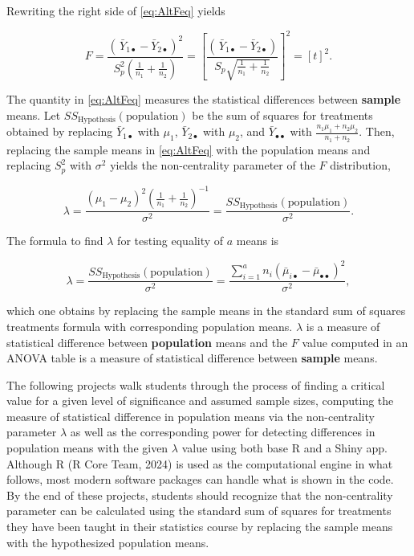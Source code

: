\documentclass[
]{article}
\begin{document}
Rewriting the right side of \eqref{eq:AltFeq} yields

\begin{equation}
F = \dfrac{(\,\bar{Y}_{1\bullet} -\bar{Y}_{2\bullet})^2 }{S^2_p\left( \frac{1}{n_1} + \frac{1}{n_2} \right)} = \left[ \dfrac{(\,\bar{Y}_{1\bullet} -\bar{Y}_{2\bullet}) }{S_p \sqrt{ \frac{1}{n_1} + \frac{1}{n_2}}} \right]^2 = [t]^2.
\label{eq:tsqEQ}
\end{equation}

The quantity in \eqref{eq:AltFeq} measures the statistical differences between \textbf{sample} means. Let \(SS_\text{Hypothesis}(\text{population})\) be the sum of squares for treatments obtained by replacing \(\bar{Y}_{1\bullet}\) with \(\mu_1\), \(\bar{Y}_{2\bullet}\) with \(\mu_2\), and \(\bar{Y}_{\bullet\bullet}\) with \(\frac{n_1\mu_1+n_2\mu_2}{n_1+n_2}\). Then, replacing the sample means in \eqref{eq:AltFeq} with the population means and replacing \(S_p^2\) with \(\sigma^2\) yields the non-centrality parameter of the \(F\) distribution,

\begin{equation*}
\lambda =  \frac{ ( \mu_1 - \mu_2 )^2\left( \frac{1}{n_1} + \frac{1}{n_2} \right)^{-1} }{\sigma^2} = \frac{SS_\text{Hypothesis}(\text{population})}{\sigma^2}.
\end{equation*}

The formula to find \(\lambda\) for testing equality of \(a\) means is

\begin{equation*}
\lambda = \frac{SS_\text{Hypothesis}(\text{population})}{\sigma^2} = \frac{\sum_{i=1}^{a}n_i(\bar{\mu}_{i\bullet} - \bar{\mu}_{\bullet\bullet})^2}{\sigma^2},
\end{equation*}

which one obtains by replacing the sample means in the standard sum of squares treatments formula with corresponding population means. \(\lambda\) is a measure of statistical difference between \textbf{population} means and the \(F\) value computed in an ANOVA table is a measure of statistical difference between \textbf{sample} means.

The following projects walk students through the process of finding a critical value for a given level of significance and assumed sample sizes, computing the measure of statistical difference in population means via the non-centrality parameter \(\lambda\) as well as the corresponding power for detecting differences in population means with the given \(\lambda\) value using both base R and a Shiny app. Although R (R Core Team, 2024) is used as the computational engine in what follows, most modern software packages can handle what is shown in the code. By the end of these projects, students should recognize that the non-centrality parameter can be calculated using the standard sum of squares for treatments they have been taught in their statistics course by replacing the sample means with the hypothesized population means.
\end{document}
